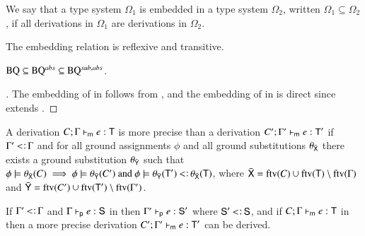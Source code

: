 \documentclass{report}
\begin{document}
  \begin{dfn}
    We say that a type system $\Omega_1$ is embedded in a type system $\Omega_2$,
    written $\Omega_1\subseteq\Omega_2$,
    if all derivations in $\Omega_1$ are derivations in $\Omega_2$.
  \end{dfn}
  \begin{thm}
    The embedding relation is reflexive and transitive.
  \end{thm}
  \begin{thm}
    $\textrm{BQ}\subseteq\textrm{BQ$^{abs}$}\subseteq\textrm{BQ$^{sub,abs}$}$.
  \end{thm}
  \begin{proof}[]
    The embedding of \BQ in \BQa follows from ,
    and the embedding of \BQa in \BQsa is direct since \BQsa extends \BQa.
  \end{proof}
  \begin{dfn}
    A derivation $C;\Gamma\vdash_\textsf{m} e:\textsf{T}$ is more precise than a derivation
    $C';\Gamma'\vdash_\textsf{m} e:\textsf{T}'$ if $\Gamma'\subtype\Gamma$ and for all ground assignments $\phi$ and
    all ground substitutions $\theta_{\bar{\textsf{X}}}$ there exists a ground substitution
    $\theta_{\bar{\textsf{Y}}}$ such that
    $\phi\csat\theta_{\bar{\type{X}}}(C) \implies \phi\csat \theta_{\bar{\type{Y}}}(C')\textrm{ and }\phi\csat \theta_{\bar{\type{Y}}}(\type{T}')\subtype\theta_{\bar{\type{X}}}(\type{T})$, where
    $\bar{\textsf{X}}=\mathop{\rm ftv}\nolimits(C)\cup\mathop{\rm ftv}\nolimits(\textsf{T})\setminus\mathop{\rm ftv}\nolimits(\Gamma)$ and $\bar{\textsf{Y}}=\mathop{\rm ftv}\nolimits(C')\cup\mathop{\rm ftv}\nolimits(\textsf{T}')\setminus\mathop{\rm ftv}\nolimits(\Gamma')$.
  \end{dfn}
  \begin{thm}[Weakening]
    If $\Gamma'\subtype\Gamma$ and $\Gamma\vdash_\textsf{p} e:\textsf{S}$ in \BQsa then
    $\Gamma'\vdash_\textsf{p} e:\textsf{S}'$ where $\type{S}'\subtype\type{S}$,
    and if $C;\Gamma\vdash_\textsf{m} e:\textsf{T}$ in \BQsa then a more precise derivation
    $C';\Gamma'\vdash_\textsf{m} e:\textsf{T}'$ can be derived.
  \end{thm}
\end{document}
